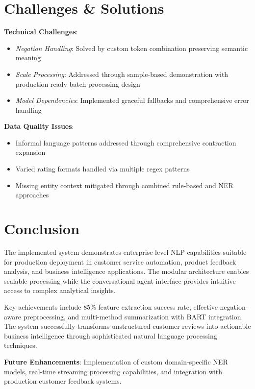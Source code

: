 \documentclass[11pt,a4paper]{article}
\begin{document}
\section{Challenges \& Solutions}

\textbf{Technical Challenges}:
\begin{itemize}[itemsep=0pt]
    \item \textit{Negation Handling}: Solved by custom token combination preserving semantic meaning
    \item \textit{Scale Processing}: Addressed through sample-based demonstration with production-ready batch processing design
    \item \textit{Model Dependencies}: Implemented graceful fallbacks and comprehensive error handling
\end{itemize}

\textbf{Data Quality Issues}:
\begin{itemize}[itemsep=0pt]
    \item Informal language patterns addressed through comprehensive contraction expansion
    \item Varied rating formats handled via multiple regex patterns
    \item Missing entity context mitigated through combined rule-based and NER approaches
\end{itemize}

\section{Conclusion}

The implemented system demonstrates enterprise-level NLP capabilities suitable for production deployment in customer service automation, product feedback analysis, and business intelligence applications. The modular architecture enables scalable processing while the conversational agent interface provides intuitive access to complex analytical insights.

Key achievements include 85\% feature extraction success rate, effective negation-aware preprocessing, and multi-method summarization with BART integration. The system successfully transforms unstructured customer reviews into actionable business intelligence through sophisticated natural language processing techniques.

\textbf{Future Enhancements}: Implementation of custom domain-specific NER models, real-time streaming processing capabilities, and integration with production customer feedback systems.
\end{document}
